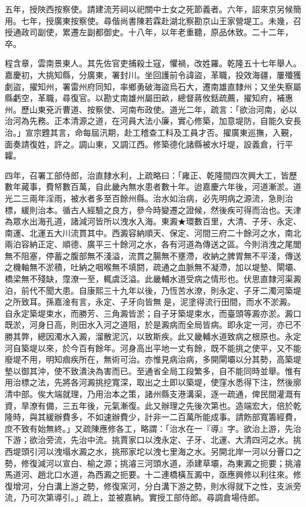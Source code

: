 \begin{pinyinscope}
五年，授陜西按察使。請建流芳祠以祀關中士女之死節義者。六年，詔來京另候簡用。七年，授廣東按察使。尋偕尚書陳若霖赴湖北察勘京山王家營堤工。未幾，召授通政司副使，累遷左副都御史。十八年，以年老重聽，原品休致。二十二年，卒。

程含章，雲南景東人。其先佐官吏捕殺土寇，懼禍，改姓羅。乾隆五十七年舉人。嘉慶初，大挑知縣，分廣東，署封川。坐回護前令諱盜，革職，投效海疆，屢殲獲劇盜，擢知州，署雷州府同知，率鄉勇破海盜烏石大，遷南雄直隸州；又坐失察屬縣虧空，革職，尋復官。以勘丈南雄州屬田畝，總督蔣攸銛疏薦，擢知府，補惠州。歷山東兗沂曹道、按察使、河南布政使。道光二年，疏言：「欲治河南，必以治河為先務。正本清源之道，在河員大法小廉，實心修築，加意堤防，自能久安長治。」宣宗韙其言，命每屆汛期，赴工稽查工料及工員才否。擢廣東巡撫，入覲，面奏請復姓，許之。調山東，又調江西。修築德化諸縣被水圩堤，設義倉，行平糶。

四年，召署工部侍郎，治直隸水利，上疏略曰：「雍正、乾隆間四次興大工，皆歷數年蕆事，費帑數百萬，自此畿內無水患者數十年。迨嘉慶六年後，河道漸淤。道光二三兩年淫雨，被水者多至百餘州縣。治水如治病，必先明病之源流，急則治標，緩則治本。循古人經驗之良方，參今時變遷之證候，然後疾可得而治也。天津為眾水出海孔道，諸減河皆所以洩水入海。東澱★環數百里，大清、子牙、永定、南運、北運五大川流貫其中。西澱容納順天、保定、河間三府二十餘河之水，南北兩泊容納正定、順德、廣平三十餘河之水，各有河道為傳送之區。今則消洩之尾閭無不阻塞，停蓄之腹部無不淺溢，流貫之腸無不壅滯，收納之脾胃無不平淺，傳送之機軸無不淤積，吐納之咽喉無不填閼，疏通之血脈無不凝滯，加以堤墊、閘壩、橋梁無不殘缺，霪潦一至，輒虞泛溢。此畿輔水道受病之情形也。伏思直隸河渠澱泊，前代不聞大患。自康熙三十九年以後，乃恆苦水潦，則永定、子牙二濁河築堤之所致耳。孫嘉淦有言，永定、子牙向皆無是，泥塗得流行田間，而水不淤澱。自永定築堤束水，而勝芳、三角澱皆淤；自子牙築堤束水，而臺頭等澱亦淤。澱口既淤，河身日高，則田水入河之道阻，於是澱病而全局皆病。即永定一河，亦已不勝其弊，總因濁水入澱，溜散泥沉，以致斯疾。此又畿輔水道致病之根原也。永定河自築堤以來，於今百有餘年。河身高出平地一丈有餘，既不能挑之使平，又不能廢堤不用，明知痼疾所在，無術可治。亦惟見病治病，多開閘壩以分其勢，高築堤墊以御其沖，使不致潰決為害而已。至通省全局工段繁多，自不能同時並舉。惟有用治標之法，先將各河澱挑挖寬深，取出之土即以築堤，使窪水悉得下注，然後廓清中部。俟大端就理，乃用治本之策，諸州縣支港溝渠，逐一疏通，俾民間灌溉有資，旱潦有備，三五年後，元氣漸復。此又辦理之先後次第也。造端宏大，倍於乾隆時，與其緩辦費多，不如速辦費少，計非一二百萬所能成事。請飭部寬籌經費，庶不致有始無終。」又疏陳應修各工，略謂：「治水在一『導』字。欲治上游，先治下游；欲治旁流，先治中流。挑賈家口以洩永定、子牙、北運、大清四河之水。挑西堤頭引河以洩塌水澱之水，挑邢家坨以洩七里海之水。另開北岸一河以分罾口之勢，修復減河以宣白、榆之源；挑濬三河頭水道，添建草壩，為東澱之扼要；挑濬馬道河、趙北口水道，為西澱之扼要。十二連橋橫亙澱中，亟應興修以利往來。修復增河，分白溝上游之勢，修復窯河，分白溝下游之勢，則水得就下之性，支派旁流，乃可次第導引。」疏上，並被嘉納。實授工部侍郎。尋調倉場侍郎。


\end{pinyinscope}
